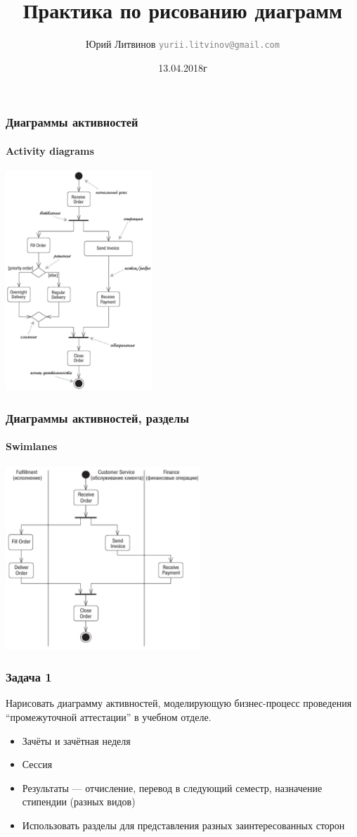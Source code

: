 \documentclass[xetex,mathserif,serif]{beamer}
\title{Практика по рисованию диаграмм}
\author[Юрий Литвинов]{Юрий Литвинов \newline \textcolor{gray}{\small\texttt{yurii.litvinov@gmail.com}}}
\date{13.04.2018г}
\begin{document}
	
	\frame{\titlepage}

	\begin{frame}
		\frametitle{Диаграммы активностей}
		\framesubtitle{Activity diagrams}
		\begin{center}
			\includegraphics[width=0.415\textwidth]{activityDiagram.png}
		\end{center}
	\end{frame}

	\begin{frame}
		\frametitle{Диаграммы активностей, разделы}
		\framesubtitle{Swimlanes}
		\begin{center}
			\includegraphics[width=0.55\textwidth]{activitySwimlanes.png}
		\end{center}
	\end{frame}

	\begin{frame}
		\frametitle{Задача 1}
		Нарисовать диаграмму активностей, моделирующую бизнес-процесс проведения ``промежуточной аттестации'' в учебном отделе.
		\begin{itemize}
			\item Зачёты и зачётная неделя
			\item Сессия
			\item Результаты --- отчисление, перевод в следующий семестр, назначение стипендии (разных видов)
			\item Использовать разделы для представления разных заинтересованных сторон
		\end{itemize}
	\end{frame}
\end{document}

